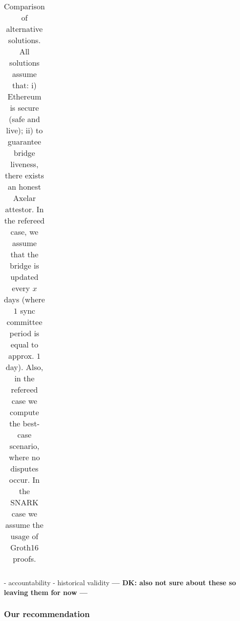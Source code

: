 \begin{table}
\begin{tabular}{|c|c|c|c|c|c|}
        \hline
    \end{tabular}
    \caption{Comparison of alternative solutions. All solutions assume that: i)
    Ethereum is secure (safe and live); ii) to guarantee bridge liveness, there
    exists an honest Axelar attestor. In the refereed case, we assume that the
    bridge is updated every $x$ days (where $1$ sync committee period is equal
    to approx. $1$ day). Also, in the refereed case we compute the best-case
    scenario, where no disputes occur. In the SNARK case we assume the usage of
    Groth16 proofs.}
    \label{tab:comparison}
\end{table}

- accountability
- historical validity
\textbf{--- DK: also not sure about these so leaving them for now ---}

\subsubsection{Our recommendation}
